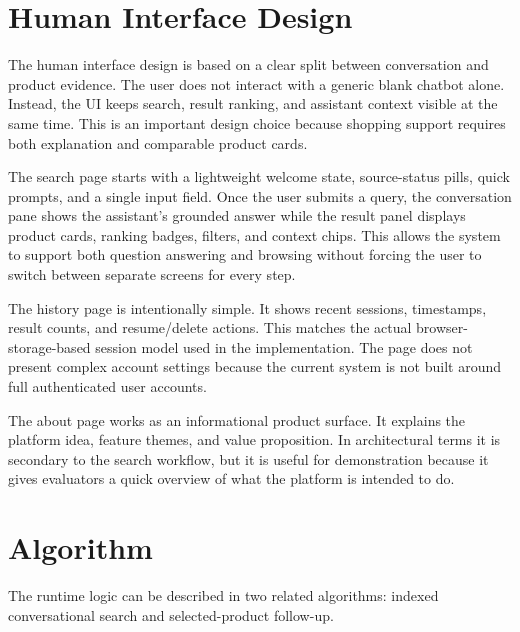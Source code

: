 \documentclass[12pt,a4paper,oneside]{report}
\begin{document}
\section{Human Interface Design}
The human interface design is based on a clear split between conversation and product evidence. The user does not interact with a generic blank chatbot alone. Instead, the UI keeps search, result ranking, and assistant context visible at the same time. This is an important design choice because shopping support requires both explanation and comparable product cards.

The search page starts with a lightweight welcome state, source-status pills, quick prompts, and a single input field. Once the user submits a query, the conversation pane shows the assistant's grounded answer while the result panel displays product cards, ranking badges, filters, and context chips. This allows the system to support both question answering and browsing without forcing the user to switch between separate screens for every step.

The history page is intentionally simple. It shows recent sessions, timestamps, result counts, and resume/delete actions. This matches the actual browser-storage-based session model used in the implementation. The page does not present complex account settings because the current system is not built around full authenticated user accounts.

The about page works as an informational product surface. It explains the platform idea, feature themes, and value proposition. In architectural terms it is secondary to the search workflow, but it is useful for demonstration because it gives evaluators a quick overview of what the platform is intended to do.

\section{Algorithm}
The runtime logic can be described in two related algorithms: indexed conversational search and selected-product follow-up.
\end{document}
